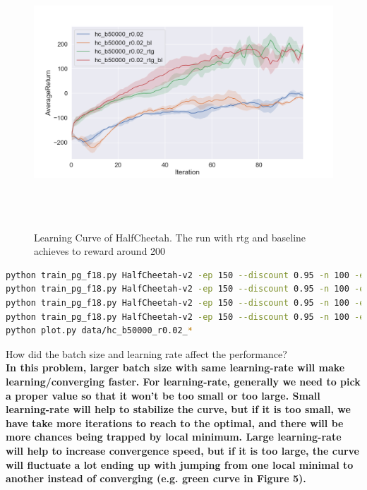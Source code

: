 \documentclass[12pt]{article}
\begin{document}
\begin{figure}[H]
  \centering
  \includegraphics[height=4in]{p8_2.png}
  \caption{Learning Curve of HalfCheetah. The run with rtg and baseline achieves to reward around 200}
\end{figure}
\begin{lstlisting}[language=bash]
python train_pg_f18.py HalfCheetah-v2 -ep 150 --discount 0.95 -n 100 -e 3 -l 2 -s 32 -b 50000 -lr 0.02 --exp_name hc_b50000_r0.02
python train_pg_f18.py HalfCheetah-v2 -ep 150 --discount 0.95 -n 100 -e 3 -l 2 -s 32 -b 50000 -lr 0.02 -rtg --exp_name hc_b50000_r0.02_rtg
python train_pg_f18.py HalfCheetah-v2 -ep 150 --discount 0.95 -n 100 -e 3 -l 2 -s 32 -b 50000 -lr 0.02 --nn_baseline --exp_name hc_b50000_r0.02_bl
python train_pg_f18.py HalfCheetah-v2 -ep 150 --discount 0.95 -n 100 -e 3 -l 2 -s 32 -b 50000 -lr 0.02 -rtg --nn_baseline --exp_name hc_b50000_r0.02_rtg_bl
python plot.py data/hc_b50000_r0.02_*
\end{lstlisting}
How did the batch size and learning rate affect the performance? \\
\textbf{In this problem, larger batch size with same learning-rate will make learning/converging faster. For learning-rate, generally we need to pick a proper value so that it won't be too small or too large. Small learning-rate will help to stabilize the curve, but if it is too small, we have take more iterations to reach to the optimal, and there will be more chances being trapped by local minimum. Large learning-rate will help to increase convergence speed, but if it is too large, the curve will fluctuate a lot ending up with jumping from one local minimal to another instead of converging (e.g. green curve in Figure 5).}
\end{document}
